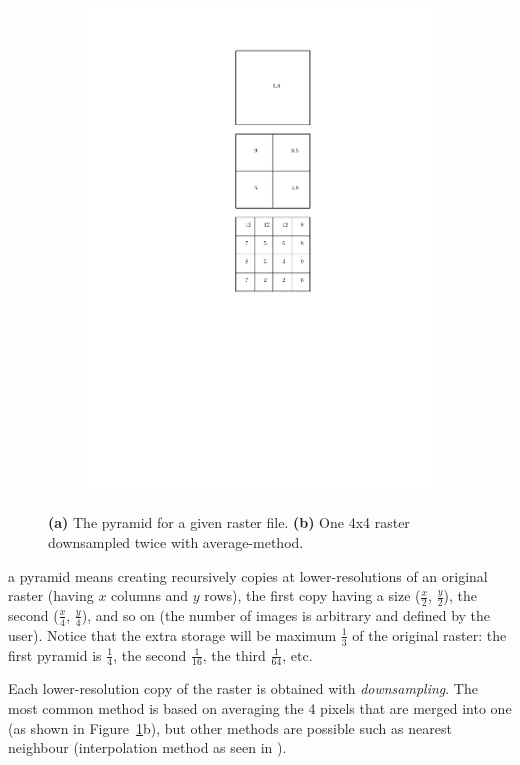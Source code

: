\begin{figure}
\begin{subfigure}[b]{0.15\linewidth}
    \includegraphics[width=\textwidth]{figs/pyramids2.pdf}
    \caption{}
  \end{subfigure}
\caption{\textbf{(a)} The pyramid for a given raster file. \textbf{(b)} One 4x4 raster downsampled twice with average-method.}
\label{fig:pyramids}
\end{figure}
a pyramid means creating recursively copies at lower-resolutions of an original raster (having $x$ columns and $y$ rows), the first copy having a size ($\frac{x}{2}$, $\frac{y}{2}$), the second ($\frac{x}{4}$, $\frac{y}{4}$), and so on (the number of images is arbitrary and defined by the user).
Notice that the extra storage will be maximum $\frac{1}{3}$ of the original raster: the first pyramid is $\frac{1}{4}$, the second $\frac{1}{16}$, the third $\frac{1}{64}$, etc.

Each lower-resolution copy of the raster is obtained with \emph{downsampling}.
The most common method is based on averaging the 4 pixels that are merged into one (as shown in Figure~\ref{fig:pyramids}b), but other methods are possible such as nearest neighbour (interpolation method as seen in ).


